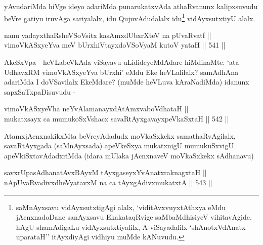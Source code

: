\begin{artha}
yAvudariMda hiVge ideyo adariMda punarukatxvAda
athaRvanunx kalipxsuvudu beVre gatiyu iruvAga sariyalalx, idu
QujuvAdudalalx idu\footnote{saMnAyxsavu vidAyxsutxtigAgi alalx,
`viditAvxvuyxtAthxya eMdu jAcnxnadoDane sanAyxsavu EkakataqRvige
saMbaMdhisiyeV vihitavAgide. hAgU shamAdigaLu vidAyxsutxtiyalilx, A
viSayadalilx `shAnotxVdAnatx uparataH'' itAyxdiyAgi vidhiyu muMde
kANuvudu.} vidAyxsutxtiyU alalx.
\end{artha}



\begin{shl}
nanu yadayxthaRsheVSoV\s sitx kasAmxdUbxrXteV na pUvaRvatf || \\
vimoVkASxyeYva meV bUrxhiVtayxdoVSoV\s yaM kutoV yataH \hfill || 541 ||  
\end{shl}

\begin{artha}
AkeSxVpa - heVLabeVkAda viSayavu uLidideyeMdAdare hiMdinaMte. `ata UdhavxRM vimoVkASxyeYva bUrxhi'
eMdu Eke heVLalilalx? samAdhAna adariMda I doVSavilalx EkeMdare?
(muMde heVLuva kAraNadiMda) idanunx sapxSaTxpaDisuvudu -
\end{artha}

\begin{shl}
vimoVkASxyeVha neYvAlamanayxdAtAmxvaboVdhataH || \\
mukatxsayx ca mumukoSxVshacx savaRtAyxgavayxpeVkaSxtaH \hfill || 542 ||  
\end{shl}

\begin{artha}
AtamxjAcnxnakikxMta beVreyAdadudx moVkaSxkekx samathaRvAgilalx,
savaRtAyxgada (saMnAyxsada) apeVkeSxya mukatxnigU mumukuSxvigU
apeVkiSxtavAdadxriMda (idara mUlaka jAcnxnaveV moVkaSxkekx sAdhanavu)
\end{artha}


\begin{shl}
savxrUpasAdhanatAvxBAyxM tAyxgaseyxYvAnatxraknagxtaH || \\
nApUvaRvadivxdheVyatavxM na ca tAyxgAdivxmukatxtA \hfill || 543 ||  
\end{shl}

